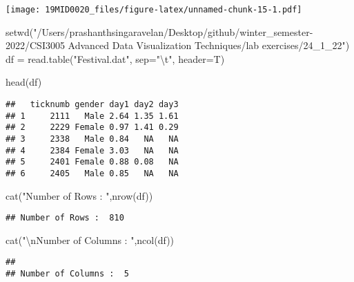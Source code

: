 \documentclass[
]{article}
\newenvironment{Shaded}{\begin{snugshade}}{\end{snugshade}}
\newcommand{\AttributeTok}[1]{\textcolor[rgb]{0.77,0.63,0.00}{#1}}
\newcommand{\FunctionTok}[1]{\textcolor[rgb]{0.00,0.00,0.00}{#1}}
\newcommand{\NormalTok}[1]{#1}
\newcommand{\OtherTok}[1]{\textcolor[rgb]{0.56,0.35,0.01}{#1}}
\newcommand{\SpecialCharTok}[1]{\textcolor[rgb]{0.00,0.00,0.00}{#1}}
\newcommand{\StringTok}[1]{\textcolor[rgb]{0.31,0.60,0.02}{#1}}
\begin{document}
\texttt{[image: 19MID0020\_files/figure-latex/unnamed-chunk-15-1.pdf]}

\begin{Shaded}
\begin{Highlighting}[]
\FunctionTok{setwd}\NormalTok{(}\StringTok{"/Users/prashanthsingaravelan/Desktop/github/winter\_semester{-}2022/CSI3005 Advanced Data Visualization Techniques/lab exercises/24\_1\_22"}\NormalTok{)}
\NormalTok{df }\OtherTok{=} \FunctionTok{read.table}\NormalTok{(}\StringTok{"Festival.dat"}\NormalTok{, }\AttributeTok{sep=}\StringTok{"}\SpecialCharTok{\textbackslash{}t}\StringTok{"}\NormalTok{, }\AttributeTok{header=}\NormalTok{T)}
\end{Highlighting}
\end{Shaded}

\begin{Shaded}
\begin{Highlighting}[]
\FunctionTok{head}\NormalTok{(df)}
\end{Highlighting}
\end{Shaded}

\begin{verbatim}
##   ticknumb gender day1 day2 day3
## 1     2111   Male 2.64 1.35 1.61
## 2     2229 Female 0.97 1.41 0.29
## 3     2338   Male 0.84   NA   NA
## 4     2384 Female 3.03   NA   NA
## 5     2401 Female 0.88 0.08   NA
## 6     2405   Male 0.85   NA   NA
\end{verbatim}

\begin{Shaded}
\begin{Highlighting}[]
\FunctionTok{cat}\NormalTok{(}\StringTok{"Number of Rows : "}\NormalTok{,}\FunctionTok{nrow}\NormalTok{(df))}
\end{Highlighting}
\end{Shaded}

\begin{verbatim}
## Number of Rows :  810
\end{verbatim}

\begin{Shaded}
\begin{Highlighting}[]
\FunctionTok{cat}\NormalTok{(}\StringTok{"}\SpecialCharTok{\textbackslash{}n}\StringTok{Number of Columns : "}\NormalTok{,}\FunctionTok{ncol}\NormalTok{(df))}
\end{Highlighting}
\end{Shaded}

\begin{verbatim}
## 
## Number of Columns :  5
\end{verbatim}
\end{document}
